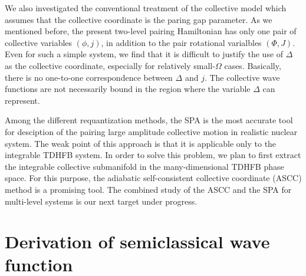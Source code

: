 \documentclass[%
superscriptaddress,
preprint,
showpacs,
nofootinbib,
amsmath,amssymb,
prc,
floatfix ]%
{revtex4-1}
\begin{document}
We also investigated the conventional treatment of
the collective model which assumes that the collective coordinate is
the paring gap parameter.
As we mentioned before, the present two-level pairing Hamiltonian has
only one pair of collective variables $(\phi,j)$, in addition to the
pair rotational varialbles $(\Phi,J)$.
Even for such a simple system, we find that it is difficult to justify
the use of $\Delta$ as the collective coordinate,
especially for relatively small-$\Omega$ cases.
Basically, there is no one-to-one correspondence between $\Delta$ and $j$.
The collective wave functions are not necessarily bound in the region
where the variable $\Delta$ can represent.


Among the different requantization methods,
the SPA is the most accurate tool for desciption of
the pairing large amplitude collective motion in realistic nuclear system.
The weak point of this approach is that it is applicable only to the
integrable TDHFB system.
In order to solve this problem, we plan to first extract the
integrable collective submanifold in the many-dimensional TDHFB phase space.
For this purpose, the adiabatic self-consistent collective coordinate (ASCC)
method \cite{NMMY16} is a promising tool.
The combined study of the ASCC and the SPA for multi-level systems is our
next target under progress.

\appendix
\section{Derivation of semiclassical wave function}
\end{document}
